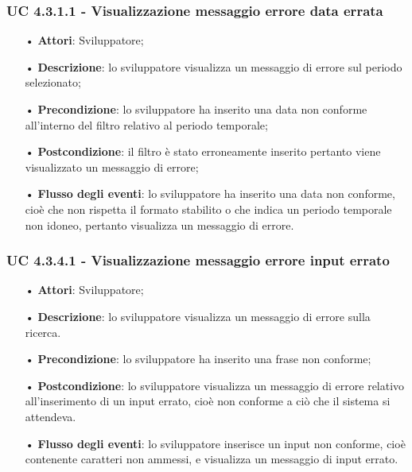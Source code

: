 \subsubsection{UC 4.3.1.1 - Visualizzazione messaggio errore data errata}
\begin{itemize}
	\item[•]\textbf{Attori}: Sviluppatore;
	\item[•]\textbf{Descrizione}: lo sviluppatore visualizza un messaggio di errore sul periodo selezionato;
	\item[•]\textbf{Precondizione}: lo sviluppatore ha inserito una data non conforme all'interno del filtro relativo al periodo temporale;
	\item[•]\textbf{Postcondizione}: il filtro è stato erroneamente inserito pertanto viene visualizzato un messaggio di errore;
	\item[•]\textbf{Flusso degli eventi}: lo sviluppatore ha inserito una data non conforme, cioè che non rispetta il formato stabilito o che indica un periodo temporale non idoneo, pertanto visualizza un messaggio di errore.
\end{itemize}
\subsubsection{UC 4.3.4.1 - Visualizzazione messaggio errore input errato}
\begin{itemize}
	\item[•]\textbf{Attori}: Sviluppatore;
	\item[•]\textbf{Descrizione}: lo sviluppatore visualizza un messaggio di errore sulla ricerca.
	\item[•]\textbf{Precondizione}: lo sviluppatore ha inserito una frase non conforme;
	\item[•]\textbf{Postcondizione}: lo sviluppatore visualizza un messaggio di errore relativo 
	all'inserimento di un input errato, cioè non conforme a ciò che il sistema si attendeva.
	\item[•]\textbf{Flusso degli eventi}: lo sviluppatore inserisce un input non conforme, cioè contenente caratteri non ammessi, e visualizza un messaggio di input errato.
\end{itemize}


